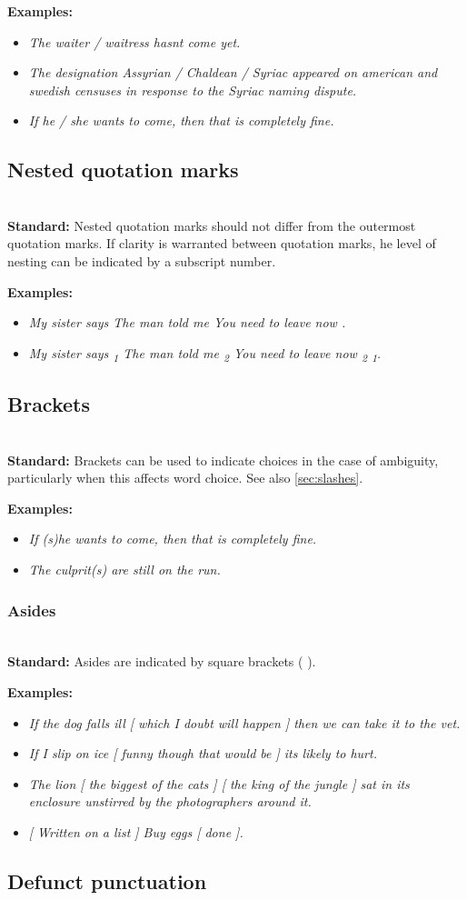 \documentclass{article}
\newcommand{\standard}[1]{\quad  \\ \textbf{Standard:} {#1}}
\newcommand{\examples}[1]{
\textbf{Examples:} \begin{itemize}
#1
\end{itemize}
}
\newcommand{\example}[1]{\item \textit{#1}}
\newcommand{\langlequote}{\guillemotleft}
\newcommand{\ranglequote}{\guillemotright}
\begin{document}
\examples{
  \example{The waiter / waitress hasnt come yet.}
  \example{The designation Assyrian / Chaldean / Syriac appeared on american and
  swedish censuses in response to the Syriac naming dispute.}
  \example{If he / she wants to come, then that is completely fine.}
}

\subsection{Nested quotation marks}

\standard{Nested quotation marks should not differ from the outermost quotation
marks. If clarity is warranted between quotation marks, he level of nesting can
be indicated by a subscript number.}

\examples{
  \example{My sister says \langlequote The man told me \langlequote You need
  to leave now \ranglequote \ranglequote.}
  \example{My sister says \langlequote \textsubscript{1} The man told me
  \langlequote \textsubscript{2} You need to leave now \ranglequote
  \textsubscript{2} \ranglequote \textsubscript{1}.}
}

\subsection{Brackets}

\standard{Brackets can be used to indicate choices in the case of ambiguity,
particularly when this affects word choice. See also \ref{sec:slashes}.}

\examples{
  \example{If (s)he wants to come, then that is completely fine.}
  \example{The culprit(s) are still on the run.}
}

\subsubsection{Asides}

\standard{Asides are indicated by square brackets ( \lbrack \rbrack ).}

\examples{
  \example{If the dog falls ill [ which I doubt will happen ] then we can take
  it to the vet.}
  \example{If I slip on ice [ funny though that would be ] its likely to hurt.}
  \example{The lion [ the biggest of the cats ] [ the king of the jungle ] sat
  in its enclosure unstirred by the photographers around it.}
  \example{[ Written on a list ] \langlequote Buy eggs [ done ]. \ranglequote}
}

\subsection{Defunct punctuation}
\end{document}
